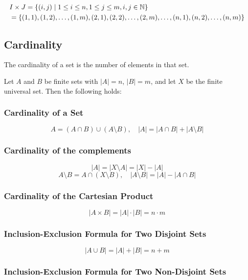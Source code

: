 \begin{align*}
&I \times J = \{ (i, j) \mid 1 \leq i \leq n, 1 \leq j \leq m, i, j \in \mathbb{N} \} \\
&= \{ (1, 1), (1, 2), \dots, (1, m), (2, 1), (2, 2), \dots, (2, m), \dots, (n, 1), (n, 2), \dots, (n, m) \}
\end{align*}

\subsection{Cardinality}

The cardinality of a set is the number of elements in that set.

Let \(A\) and \(B\) be finite sets with \( |A| = n \), \( |B| = m \), and let \(X\) be the finite 
universal set. Then the following holds:

\subsubsection{Cardinality of a Set}

\[
	A = (A \cap B) \cup (A \setminus B), \quad |A| = |A \cap B| + |A \setminus B|
\]

\subsubsection{Cardinality of the complements}

\[
	|A| = |X \setminus A| = |X| - |A|
\]
\[
	A \setminus B = A \cap (X \setminus B), \quad |A \setminus B| = |A| - |A \cap B|
\]

\subsubsection{Cardinality of the Cartesian Product}

\[
	|A \times B| = |A| \cdot |B| = n \cdot m
\]

\subsubsection{Inclusion-Exclusion Formula for Two Disjoint Sets}

\[
	|A \cup B| = |A| + |B| = n + m
\]

\subsubsection{Inclusion-Exclusion Formula for Two Non-Disjoint Sets}

